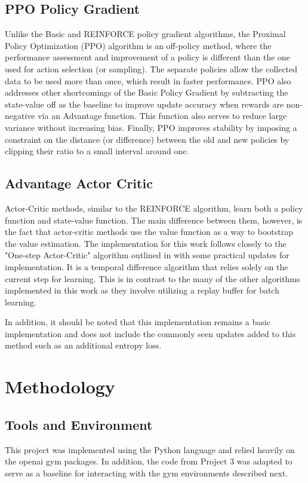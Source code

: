 \documentclass[conference]{IEEEtran}
\begin{document}
\subsection{PPO Policy Gradient}
Unlike the Basic and REINFORCE policy gradient algorithms, the Proximal Policy Optimization (PPO) algorithm is an off-policy method, where the performance assessment and improvement of a policy is different than the one used for action selection (or sampling). The separate policies allow the collected data to be used more than once, which result in faster performance. PPO also addresses other shortcomings of the Basic Policy Gradient by subtracting the state-value off as the baseline to improve update accuracy when rewards are non-negative via an Advantage function. This function also serves to reduce large variance without increasing bias. Finally, PPO improves stability by imposing a constraint on the distance (or difference) between the old and new policies by clipping their ratio to a small interval around one.

\subsection{Advantage Actor Critic}
Actor-Critic methods, similar to the REINFORCE algorithm, learn both a policy function and state-value function.
The main difference between them, however, is the fact that actor-critic methods use the value function as a way to bootstrap the value estimation.
The implementation for this work follows closely to the "One-step Actor-Critic" algorithm outlined in \cite{ReinforcementLearningBook} with some practical updates for implementation.
It is a temporal difference algorithm that relies solely on the current step for learning.
This is in contrast to the many of the other algorithms implemented in this work as they involve utilizing a replay buffer for batch learning.

In addition, it should be noted that this implementation remains a basic implementation and does not include the commonly seen updates added to this method such as an additional entropy loss.

\section{Methodology} \label{methodology}

\subsection{Tools and Environment}
This project was implemented using the Python language and relied heavily on the openai gym packages.
In addition, the code from Project 3 was adapted to serve as a baseline for interacting with the gym environments described next.
\end{document}
